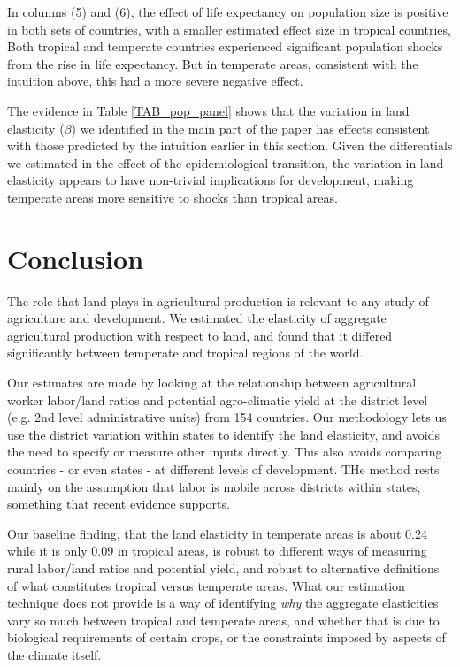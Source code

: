 \documentclass[11pt]{article}
\begin{document}
In columns (5) and (6), the effect of life expectancy on population size is positive in both sets of countries, with a smaller estimated effect size in tropical countries, Both tropical and temperate countries experienced significant population shocks from the rise in life expectancy. But in temperate areas, consistent with the intuition above, this had a more severe negative effect.

The evidence in Table \ref{TAB_pop_panel} shows that the variation in land elasticity ($\beta$) we identified in the main part of the paper has effects consistent with those predicted by the intuition earlier in this section. Given the differentials we estimated in the effect of the epidemiological transition, the variation in land elasticity appears to have non-trivial implications for development, making temperate areas more sensitive to shocks than tropical areas.

\section{Conclusion}
The role that land plays in agricultural production is relevant to any study of agriculture and development. We estimated the elasticity of aggregate agricultural production with respect to land, and found that it differed significantly between temperate and tropical regions of the world.

Our estimates are made by looking at the relationship between agricultural worker labor/land ratios and potential agro-climatic yield at the district level (e.g. 2nd level administrative units) from 154 countries. Our methodology lets us use the district variation within states to identify the land elasticity, and avoids the need to specify or measure other inputs directly. This also avoids comparing countries - or even states - at different levels of development. THe method rests mainly on the assumption that labor is mobile across districts within states, something that recent evidence supports. 

Our baseline finding, that the land elasticity in temperate areas is about 0.24 while it is only 0.09 in tropical areas, is robust to different ways of measuring rural labor/land ratios and potential yield, and robust to alternative definitions of what constitutes tropical versus temperate areas. What our estimation technique does not provide is a way of identifying \textit{why} the aggregate elasticities vary so much between tropical and temperate areas, and whether that is due to biological requirements of certain crops, or the constraints imposed by aspects of the climate itself.
\end{document}
